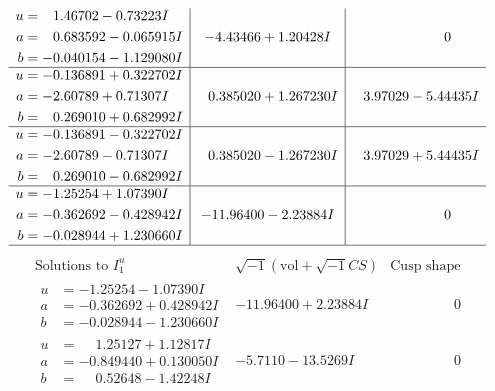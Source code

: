 \documentclass[1p]{elsarticle_modified}
\theoremstyle{definition}
\newcommand{\I}{\sqrt{-1}}
\begin{document}
$$\begin{array}{c|c|c}
\begin{aligned}
u &= \phantom{-}1.46702 - 0.73223 I \\
a &= \phantom{-}0.683592 - 0.065915 I \\
b &= -0.040154 - 1.129080 I\end{aligned}
 & -4.43466 + 1.20428 I & \phantom{-0.000000 } 0 \\ \hline\begin{aligned}
u &= -0.136891 + 0.322702 I \\
a &= -2.60789 + 0.71307 I \\
b &= \phantom{-}0.269010 + 0.682992 I\end{aligned}
 & \phantom{-}0.385020 + 1.267230 I & \phantom{-}3.97029 - 5.44435 I \\ \hline\begin{aligned}
u &= -0.136891 - 0.322702 I \\
a &= -2.60789 - 0.71307 I \\
b &= \phantom{-}0.269010 - 0.682992 I\end{aligned}
 & \phantom{-}0.385020 - 1.267230 I & \phantom{-}3.97029 + 5.44435 I \\ \hline\begin{aligned}
u &= -1.25254 + 1.07390 I \\
a &= -0.362692 - 0.428942 I \\
b &= -0.028944 + 1.230660 I\end{aligned}
 & -11.96400 - 2.23884 I & \phantom{-0.000000 } 0\\
 \hline 
 \end{array}$$\newpage$$\begin{array}{c|c|c}  
\text{Solutions to }I^u_{1}& \I (\text{vol} + \sqrt{-1}CS) & \text{Cusp shape}\\
 \hline 
\begin{aligned}
u &= -1.25254 - 1.07390 I \\
a &= -0.362692 + 0.428942 I \\
b &= -0.028944 - 1.230660 I\end{aligned}
 & -11.96400 + 2.23884 I & \phantom{-0.000000 } 0 \\ \hline\begin{aligned}
u &= \phantom{-}1.25127 + 1.12817 I \\
a &= -0.849440 + 0.130050 I \\
b &= \phantom{-}0.52648 - 1.42248 I\end{aligned}
 & -5.7110 - 13.5269 I & \phantom{-0.000000 } 0 \\ \hline\begin{aligned}

\end{aligned}
\end{array}$$
\end{document}
